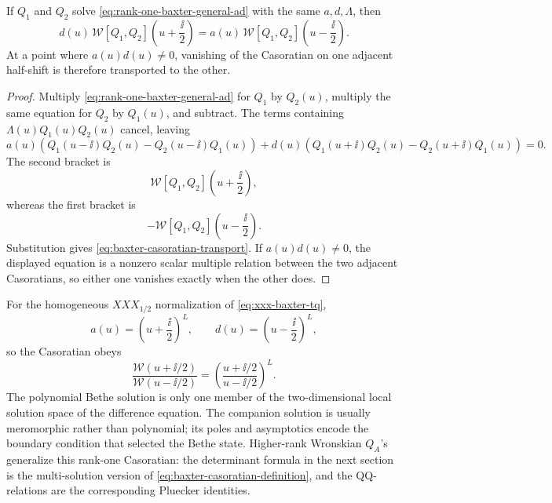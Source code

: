 \begin{lemma}
\label{lem:baxter-casoratian-transport}
If \(Q_1\) and \(Q_2\) solve \eqref{eq:rank-one-baxter-general-ad} with the
same \(a,d,\Lambda\), then
\begin{equation}
  d(u)\,
  \mathcal W[Q_1,Q_2]\!\left(u+\frac{\ii}{2}\right)
  =
  a(u)\,
  \mathcal W[Q_1,Q_2]\!\left(u-\frac{\ii}{2}\right).
  \label{eq:baxter-casoratian-transport}
\end{equation}
At a point where \(a(u)d(u)\ne0\), vanishing of the Casoratian on one
adjacent half-shift is therefore transported to the other.
\end{lemma}

\begin{proof}
Multiply \eqref{eq:rank-one-baxter-general-ad} for \(Q_1\) by \(Q_2(u)\),
multiply the same equation for \(Q_2\) by \(Q_1(u)\), and subtract.  The
terms containing \(\Lambda(u)Q_1(u)Q_2(u)\) cancel, leaving
\[
  a(u)
  \left(Q_1(u-\ii)Q_2(u)-Q_2(u-\ii)Q_1(u)\right)
  +
  d(u)
  \left(Q_1(u+\ii)Q_2(u)-Q_2(u+\ii)Q_1(u)\right)
  =
  0 .
\]
The second bracket is
\[
  \mathcal W[Q_1,Q_2]\!\left(u+\frac{\ii}{2}\right),
\]
whereas the first bracket is
\[
  -\mathcal W[Q_1,Q_2]\!\left(u-\frac{\ii}{2}\right).
\]
Substitution gives \eqref{eq:baxter-casoratian-transport}.  If
\(a(u)d(u)\ne0\), the displayed equation is a nonzero scalar multiple
relation between the two adjacent Casoratians, so either one vanishes exactly
when the other does.
\end{proof}

For the homogeneous \(XXX_{1/2}\) normalization of
\eqref{eq:xxx-baxter-tq},
\[
  a(u)=\left(u+\frac{\ii}{2}\right)^L,\qquad
  d(u)=\left(u-\frac{\ii}{2}\right)^L,
\]
so the Casoratian obeys
\begin{equation}
  \frac{\mathcal W(u+\ii/2)}{\mathcal W(u-\ii/2)}
  =
  \left(\frac{u+\ii/2}{u-\ii/2}\right)^L .
  \label{eq:xxx-casoratian-ratio}
\end{equation}
The polynomial Bethe solution is only one member of the two-dimensional
local solution space of the difference equation.  The companion solution is
usually meromorphic rather than polynomial; its poles and asymptotics encode
the boundary condition that selected the Bethe state.  Higher-rank
Wronskian \(Q_A\)'s generalize this rank-one Casoratian: the determinant
formula in the next section is the multi-solution version of
\eqref{eq:baxter-casoratian-definition}, and the QQ-relations are the
corresponding Pluecker identities.

